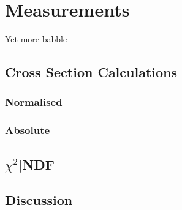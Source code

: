 \section{Measurements}
\label{sec:measurements}

Yet more babble

\subsection{Cross Section Calculations}
\label{ssec:xsec}
\subsubsection{Normalised}
\subsubsection{Absolute}

\subsection{$\chi^{2}$|NDF}
\label{ssec:chi2}

\subsection{Discussion}
\label{ssec:disc}
